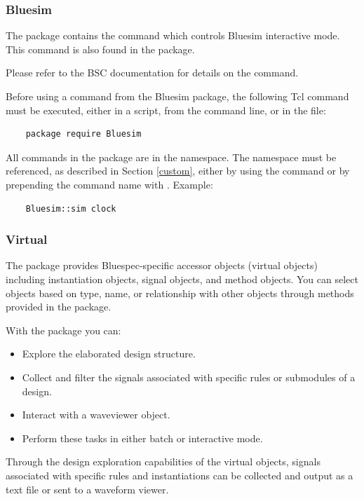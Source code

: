 \subsubsection{Bluesim}

The  package contains the  command which controls
Bluesim interactive mode.  This command is also found in the
 package.

Please refer to the BSC documentation for details on the
 command.

Before using a command from the Bluesim package,  the
following Tcl command must  be executed, either in a script, 
from the command line, or in the  file:
\begin{verbatim}
    package require Bluesim
\end{verbatim}

All commands in the  package are in the  
namespace.  The namespace must be referenced, as described in Section
\ref{custom}, either by using the  command or by
prepending the command name with .  Example:
\begin{verbatim}
    Bluesim::sim clock
\end{verbatim}


\subsubsection{Virtual}
\label{app-virtual}

The  package provides Bluespec-specific accessor objects
 (virtual objects) including instantiation objects, signal objects,
 and method objects.  You  can select objects based on type, name, or
 relationship with other objects through 
 methods provided in the package.

With the   package you can:
\begin{itemize}
\item  Explore the elaborated design structure.
\item  Collect and filter the signals associated with specific
rules or submodules of a design.
\item Interact with a waveviewer object.
\item Perform these tasks in either batch or interactive mode.
\end{itemize}

Through  the design exploration capabilities of  the virtual
objects, signals associated with specific rules and instantiations can
be collected and output as a text file or  sent to a
waveform viewer.  

